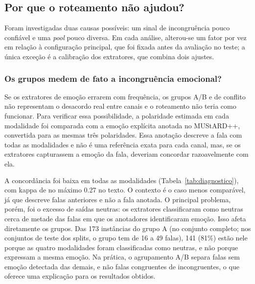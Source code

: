 \documentclass[conference]{IEEEtran}
\begin{document}
\subsection{Por que o roteamento não ajudou?}
\label{subsec:ablacao}

Foram investigadas duas causas possíveis: um sinal de incongruência pouco confiável e uma \textit{pool} pouco diversa. Em cada análise, alterou-se um fator por vez em relação à configuração principal, que foi fixada antes da avaliação no teste; a única exceção é a calibração dos extratores, que combina dois ajustes.

\subsubsection{Os grupos medem de fato a incongruência emocional?}

Se os extratores de emoção errarem com frequência, os grupos A/B e de conflito não representam o desacordo real entre canais e o roteamento não teria como funcionar. Para verificar essa possibilidade, a polaridade estimada em cada modalidade foi comparada com a emoção explícita anotada no MUStARD++, convertida para as mesmas três polaridades. Essa anotação descreve a fala com todas as modalidades e não é uma referência exata para cada canal, mas, se os extratores capturassem a emoção da fala, deveriam concordar razoavelmente com ela.

A concordância foi baixa em todas as modalidades (Tabela~\ref{tab:diagnostico}), com kappa de no máximo 0.27 no texto. O contexto é o caso menos comparável, já que descreve falas anteriores e não a fala anotada. O principal problema, porém, foi o excesso de saídas neutras: os extratores classificaram como neutras cerca de metade das falas em que os anotadores identificaram emoção. Isso afeta diretamente os grupos. Das 173 instâncias do grupo A (no conjunto completo; nos conjuntos de teste dos splits, o grupo tem de 16 a 49 falas), 141 (81\%) estão nele porque as quatro modalidades foram classificadas como neutras, e não porque expressam a mesma emoção. Na prática, o agrupamento A/B separa falas sem emoção detectada das demais, e não falas congruentes de incongruentes, o que oferece uma explicação para os resultados obtidos.


\end{document}
